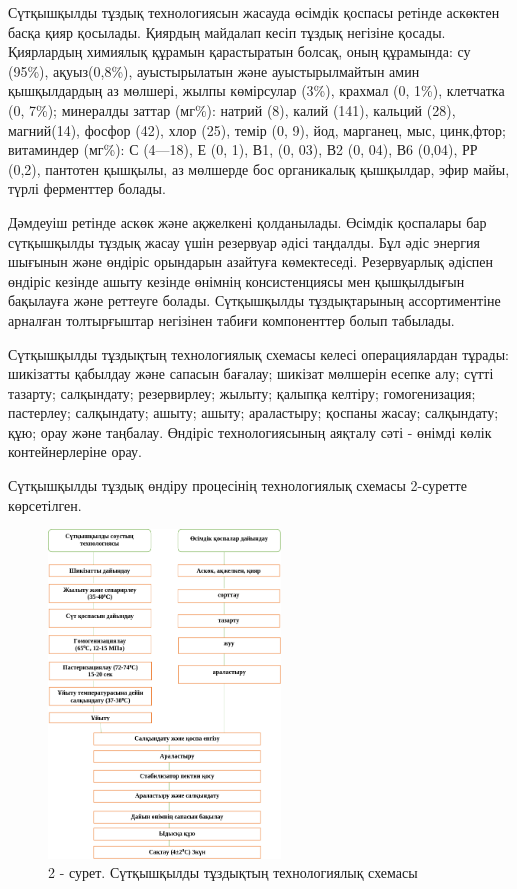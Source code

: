 \begin{multicols}{2}
Сүтқышқылды тұздық технологиясын жасауда өсімдік қоспасы ретінде
аскөктен басқа қияр қосылады. Қиярдың майдалап кесіп тұздық негізіне
қосады. Қиярлардың химиялық құрамын қарастыратын болсақ, оның құрамында:
су (95\%), ақуыз(0,8\%), ауыстырылатын және ауыстырылмайтын амин
қышқылдардың аз мөлшері, жылпы көмірсулар (3\%), крахмал (0, 1\%),
клетчатка (0, 7\%); минералды заттар (мг\%): натрий (8), калий (141),
кальций (28), магний(14), фосфор (42), хлор (25), темір (0, 9), йод,
марганец, мыс, цинк,фтор; витаминдер (мг\%): С (4---18), Е (0, 1), В1,
(0, 03), В2 (0, 04), В6 (0,04), РР (0,2), пантотен қышқылы, аз мөлшерде
бос органикалық қышқылдар, эфир майы, түрлі ферменттер болады.

Дәмдеуіш ретінде аскөк және ақжелкені қолданылады. Өсімдік қоспалары бар
сүтқышқылды тұздық жасау үшін резервуар әдісі таңдалды. Бұл әдіс энергия
шығынын және өндіріс орындарын азайтуға көмектеседі. Резервуарлық
әдіспен өндіріс кезінде ашыту кезінде өнімнің консистенциясы мен
қышқылдығын бақылауға және реттеуге болады. Сүтқышқылды тұздықтарының
ассортиментіне арналған толтырғыштар негізінен табиғи компоненттер болып
табылады.

Сүтқышқылды тұздықтың технологиялық схемасы келесі операциялардан
тұрады: шикізатты қабылдау және сапасын бағалау; шикізат мөлшерін есепке
алу; сүтті тазарту; салқындату; резервирлеу; жылыту; қалыпқа келтіру;
гомогенизация; пастерлеу; салқындату; ашыту; ашыту; араластыру; қоспаны
жасау; салқындату; құю; орау және таңбалау. Өндіріс технологиясының
аяқталу сәті - өнімді көлік контейнерлеріне орау.

Сүтқышқылды тұздық өндіру процесінің технологиялық схемасы 2-суретте
көрсетілген.
\end{multicols}

\begin{figure}[H]
	\centering
	\includegraphics[width=0.55\textwidth]{media/pish2/image25}
	\caption*{2 - сурет. Сүтқышқылды тұздықтың технологиялық схемасы}
\end{figure}

